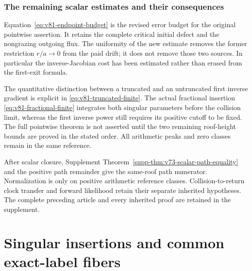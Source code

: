 \documentclass[11pt,reqno]{amsart}
\numberwithin{equation}{section}
\theoremstyle{definition}\newtheorem{definition}[theorem]{Definition}
\theoremstyle{remark}\newtheorem{remark}[theorem]{Remark}
\theoremstyle{definition}\newtheorem{inputstatement}[theorem]{Input statement}
\begin{document}












\section{The remaining scalar estimates and their consequences}
Equation~\eqref{eq:v81-endpoint-budget} is the revised error budget
for the original pointwise assertion. It retains the complete
critical initial defect and the nongrazing outgoing flux. The
uniformity of the new estimate removes the former restriction
$r/a\to0$ from the paid drift; it does not remove those two sources.
In particular the inverse-Jacobian cost has been estimated rather
than erased from the first-exit formula.

The quantitative distinction between a truncated and an untruncated
first inverse gradient is explicit in
\eqref{eq:v81-truncated-finite}. The actual fractional insertion
\eqref{eq:v81-fractional-finite} integrates both singular parameters
before the collision limit, whereas the first inverse power still
requires its positive cutoff to be fixed. The full pointwise theorem
is not asserted until the two remaining roof-height bounds are
proved in the stated order. All arithmetic peaks and zero classes
remain in the same reference.

After scalar closure, Supplement
Theorem~\ref{supp-thm:v73-scalar-path-equality} and the positive path
remainder give the same-roof path numerator. Normalization is only
on positive arithmetic reference classes. Collision-to-return clock
transfer and forward likelihood retain their separate inherited
hypotheses. The complete preceding article and every inherited proof
are retained in the supplement.


\endgroup
\part{Singular insertions and common exact-label fibers}
\begingroup
\let\ArchiveLabel\label
\let\ArchiveRef\ref
\renewcommand{\label}[1]{\ArchiveLabel{v80archive:#1}}
\renewcommand{\ref}[1]{%
  \IfBeginWith{#1}{supp-}{%
    \StrBehind{#1}{supp-}[\ArchiveTarget]%
    \ArchiveRef{\ArchiveTarget}%
  }{\ArchiveRef{v80archive:#1}}%
}
\makeatletter
\let\ltx@label\label
\makeatother
\end{document}
